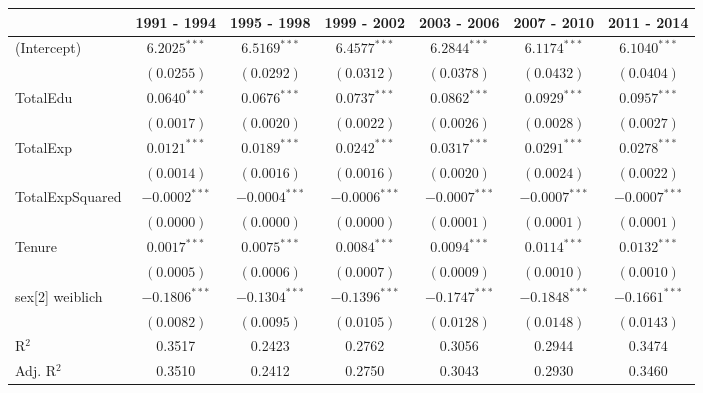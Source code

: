 
\begin{table}
\begin{center}
\begin{small}
\begin{tabular}{l c c c c c c }
\hline
 & 1991 - 1994 & 1995 - 1998 & 1999 - 2002 & 2003 - 2006 & 2007 - 2010 & 2011 - 2014 \\
\hline
(Intercept)     & $6.2025^{***}$  & $6.5169^{***}$  & $6.4577^{***}$  & $6.2844^{***}$  & $6.1174^{***}$  & $6.1040^{***}$  \\
                & $(0.0255)$      & $(0.0292)$      & $(0.0312)$      & $(0.0378)$      & $(0.0432)$      & $(0.0404)$      \\
TotalEdu        & $0.0640^{***}$  & $0.0676^{***}$  & $0.0737^{***}$  & $0.0862^{***}$  & $0.0929^{***}$  & $0.0957^{***}$  \\
                & $(0.0017)$      & $(0.0020)$      & $(0.0022)$      & $(0.0026)$      & $(0.0028)$      & $(0.0027)$      \\
TotalExp        & $0.0121^{***}$  & $0.0189^{***}$  & $0.0242^{***}$  & $0.0317^{***}$  & $0.0291^{***}$  & $0.0278^{***}$  \\
                & $(0.0014)$      & $(0.0016)$      & $(0.0016)$      & $(0.0020)$      & $(0.0024)$      & $(0.0022)$      \\
TotalExpSquared & $-0.0002^{***}$ & $-0.0004^{***}$ & $-0.0006^{***}$ & $-0.0007^{***}$ & $-0.0007^{***}$ & $-0.0007^{***}$ \\
                & $(0.0000)$      & $(0.0000)$      & $(0.0000)$      & $(0.0001)$      & $(0.0001)$      & $(0.0001)$      \\
Tenure          & $0.0017^{***}$  & $0.0075^{***}$  & $0.0084^{***}$  & $0.0094^{***}$  & $0.0114^{***}$  & $0.0132^{***}$  \\
                & $(0.0005)$      & $(0.0006)$      & $(0.0007)$      & $(0.0009)$      & $(0.0010)$      & $(0.0010)$      \\
sex[2] weiblich & $-0.1806^{***}$ & $-0.1304^{***}$ & $-0.1396^{***}$ & $-0.1747^{***}$ & $-0.1848^{***}$ & $-0.1661^{***}$ \\
                & $(0.0082)$      & $(0.0095)$      & $(0.0105)$      & $(0.0128)$      & $(0.0148)$      & $(0.0143)$      \\
\hline
R$^2$           & 0.3517          & 0.2423          & 0.2762          & 0.3056          & 0.2944          & 0.3474          \\
Adj. R$^2$      & 0.3510          & 0.2412          & 0.2750          & 0.3043          & 0.2930          & 0.3460          \\

\end{tabular}
\end{small}
\end{center}
\end{table}
